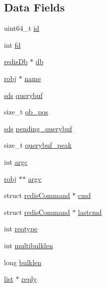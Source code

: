 \subsection*{Data Fields}
\begin{DoxyCompactItemize}
\item 
uint64\+\_\+t \hyperlink{structclient_a7e290573ef1be67b92a2c745e3b00d1d}{id}
\item 
int \hyperlink{structclient_a6f8059414f0228f0256115e024eeed4b}{fd}
\item 
\hyperlink{structredis_db}{redis\+Db} $\ast$ \hyperlink{structclient_a9bee04e09635a42fef289e42a89f5502}{db}
\item 
\hyperlink{server_8h_a540f174d2685422fbd7d12e3cd44c8e2}{robj} $\ast$ \hyperlink{structclient_a363eae5cb1f099d7803cca951bef7ac2}{name}
\item 
\hyperlink{sds_8h_ad69abac3df4532879db9642c95f5ef6f}{sds} \hyperlink{structclient_accf8e4a2bc6b80403d3f0f024eaa8a1b}{querybuf}
\item 
size\+\_\+t \hyperlink{structclient_a2de8996d6723315d26c64886145d5e51}{qb\+\_\+pos}
\item 
\hyperlink{sds_8h_ad69abac3df4532879db9642c95f5ef6f}{sds} \hyperlink{structclient_ae41c09e14760e794d4378519d312ba9a}{pending\+\_\+querybuf}
\item 
size\+\_\+t \hyperlink{structclient_a09bca2273efb7490d637016ba048ae6e}{querybuf\+\_\+peak}
\item 
int \hyperlink{structclient_ad1447518f4372828b8435ae82e48499e}{argc}
\item 
\hyperlink{server_8h_a540f174d2685422fbd7d12e3cd44c8e2}{robj} $\ast$$\ast$ \hyperlink{structclient_a5c75dd3cb8eb8a3f5be7d4fdf48a9ef9}{argv}
\item 
struct \hyperlink{structredis_command}{redis\+Command} $\ast$ \hyperlink{structclient_a8ed6c4d0c6382ad1787b32d10db25c5e}{cmd}
\item 
struct \hyperlink{structredis_command}{redis\+Command} $\ast$ \hyperlink{structclient_a81d89da91093b6bd8a49acf4a58d47b4}{lastcmd}
\item 
int \hyperlink{structclient_a7c68e9e1d202efcb938b7527f7495de9}{reqtype}
\item 
int \hyperlink{structclient_a0fb4b72a537074c92ed763feb2d46d91}{multibulklen}
\item 
long \hyperlink{structclient_afdb54e1a6b1343bfb0535e4b0ceaa8a9}{bulklen}
\item 
\hyperlink{structlist}{list} $\ast$ \hyperlink{structclient_a3c5720baa890941d827d99224a615377}{reply}
$$
\end{DoxyCompactItemize}
